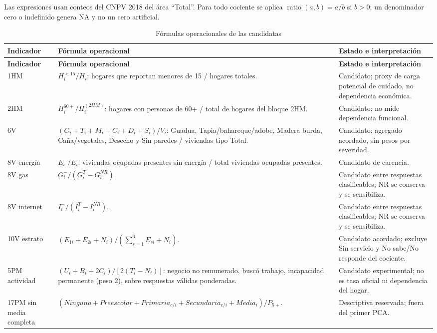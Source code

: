 Las expresiones usan conteos del CNPV 2018 del área \enquote{Total}. Para todo cociente se aplica $\operatorname{ratio}(a,b)=a/b$ si $b>0$; un denominador cero o indefinido genera NA y no un cero artificial.

\begin{singlespace}\small
\begin{longtable}{@{}p{}p{}p{}@{}}
\caption{Fórmulas operacionales de las candidatas}\label{tab:formulas_algebraicas}\\
\toprule
\textbf{Indicador} & \textbf{Fórmula operacional} & \textbf{Estado e interpretación}\\
\midrule
\endfirsthead
\toprule
\textbf{Indicador} & \textbf{Fórmula operacional} & \textbf{Estado e interpretación}\\
\midrule
\endhead
1HM & $H^{<15}_i/H_i$: hogares que reportan menores de 15 / hogares totales. & Candidato; proxy de carga potencial de cuidado, no dependencia económica.\\
2HM & $H^{60+}_i/H^{(2HM)}_i$: hogares con personas de 60+ / total de hogares del bloque 2HM. & Candidato; no mide dependencia funcional.\\
6V & $(G_i+T_i+M_i+C_i+D_i+S_i)/V_i$: Guadua, Tapia/bahareque/adobe, Madera burda, Caña/vegetales, Desecho y Sin paredes / viviendas tipo Total. & Candidato; agregado acordado, sin pesos por severidad.\\
8V energía & $E_i^{-}/E_i$: viviendas ocupadas presentes sin energía / total viviendas ocupadas presentes. & Candidato de carencia.\\
8V gas & $G_i^{-}/(G_i^{T}-G_i^{NR})$. & Candidato entre respuestas clasificables; NR se conserva y se sensibiliza.\\
8V internet & $I_i^{-}/(I_i^{T}-I_i^{NR})$. & Candidato entre respuestas clasificables; NR se conserva y se sensibiliza.\\
10V estrato & $(E_{1i}+E_{2i}+N_i)/(\sum_{s=1}^{6}E_{si}+N_i)$. & Candidato acordado; excluye Sin servicio y No sabe/No responde del cociente.\\
5PM actividad & $(U_i+B_i+2C_i)/[2(T_i-N_i)]$: negocio no remunerado, buscó trabajo, incapacidad permanente (peso 2), sobre respuestas válidas ponderadas. & Candidato experimental; no es tasa oficial ni dependencia del hogar.\\
17PM sin media completa & $(Ninguno+Preescolar+Primaria_{c/i}+Secundaria_{c/i}+Media_i)/P_{5+}$. & Descriptiva reservada; fuera del primer PCA.\\
\bottomrule
\end{longtable}
\end{singlespace}

